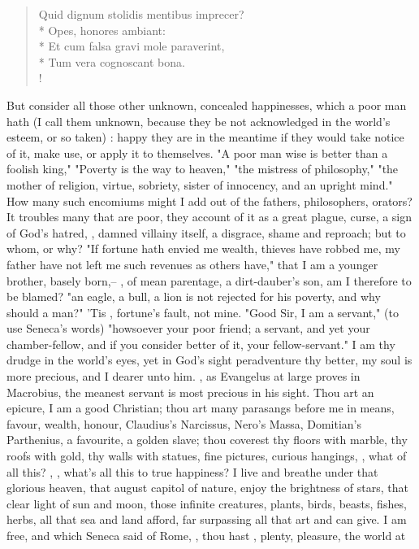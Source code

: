 {\begin{latin}
\begin{verse}
Quid dignum stolidis mentibus imprecer?\\*
Opes, honores ambiant:\\*
Et cum falsa gravi mole paraverint,\\*
Tum vera cognoscant bona.\\!
\end{verse}
\end{latin}
%

But consider all those other unknown, concealed happinesses, which a poor man hath (I call them unknown, because they be not acknowledged in the world's esteem, or so taken) : happy they are in the meantime if they would take notice of it, make use, or apply it to themselves. "A poor man wise is better than a foolish king,"  "Poverty is the way to heaven," "the mistress of philosophy," "the mother of religion, virtue, sobriety, sister of innocency, and an upright mind." How many such encomiums might I add out of the fathers, philosophers, orators? It troubles many that are poor, they account of it as a great plague, curse, a sign of God's hatred, , damned villainy itself, a disgrace, shame and reproach; but to whom, or why? "If fortune hath envied me wealth, thieves have robbed me, my father have not left me such revenues as others have," that I am a younger brother, basely born,-- , of mean parentage, a dirt-dauber's son, am I therefore to be blamed? "an eagle, a bull, a lion is not rejected for his poverty, and why should a man?" 'Tis , fortune's fault, not mine. "Good Sir, I am a servant," (to use Seneca's words) "howsoever your poor friend; a servant, and yet your chamber-fellow, and if you consider better of it, your fellow-servant." I am thy drudge in the world's eyes, yet in God's sight peradventure thy better, my soul is more precious, and I dearer unto him. , as Evangelus at large proves in Macrobius, the meanest servant is most precious in his sight. Thou art an epicure, I am a good Christian; thou art many parasangs before me in means, favour, wealth, honour, Claudius's Narcissus, Nero's Massa, Domitian's Parthenius, a favourite, a golden slave; thou coverest thy floors with marble, thy roofs with gold, thy walls with statues, fine pictures, curious hangings, \etc{}, what of all this? , \etc{}, what's all this to true happiness? I live and breathe under that glorious heaven, that august capitol of nature, enjoy the brightness of stars, that clear light of sun and moon, those infinite creatures, plants, birds, beasts, fishes, herbs, all that sea and land afford, far surpassing all that art and  can give. I am free, and which Seneca said of Rome, , thou hast , plenty, pleasure, the world at }
